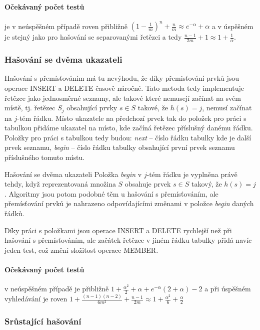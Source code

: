 \paragraph{Očekávaný počet testů} je v neúspěšném případě roven přibližně
$(1-\frac{1}{m})^n+\frac{n}{m}\approx e^{-\alpha}+\alpha$ a v úspěšném je stejný
jako pro hašování se separovanými řetězci a tedy $\frac{n-1}{2m}+1 \approx 1 +
\frac{1}{\alpha}$.

\subsubsection*{Hašování se dvěma ukazateli}

Hašování s přemísťováním má tu nevýhodu, že díky přemisťování prvků jsou operace
INSERT a DELETE časově náročné. Tato metoda tedy implementuje řetězce jako
jednosměrné seznamy, ale takové které nemusejí začínat na svém místě, tj.
řetězec $S_j$ obsahující prvky $s \in S$ takové, že $h(s)=j$, nemusí začínat na
$j$-tém řádku. Místo ukazatele na předchozí prvek tak do položek pro práci s
tabulkou přidáme ukazatel na místo, kde začíná řetězec příslušný danému řádku.
Položky pro práci s tabulkou tedy budou: \emph{next} -- číslo řádku tabulky kde
je další prvek seznamu, \emph{begin} -- číslo řádku tabulky obsahující první
prvek seznamu příslušného tomuto místu.

\begin{algoritmusN}{Hašování se dvěma ukazateli}
Položka \emph{begin} v $j$-tém řádku je vyplněna právě tehdy, když
reprezentovaná množina $S$ obsahuje prvek $s \in S$ takový, že $h(s)=j$.
Algoritmy jsou potom podobné těm u hašování s přemísťováním, ale přemísťování
prvků je nahrazeno odpovídajícími změnami v položce \emph{begin} daných řádků.
\end{algoritmusN}

Díky práci s položkami jsou operace INSERT a DELETE rychlejší než při hašování s
přemísťováním, ale začátek řetězce v jiném řádku tabulky přidá navíc jeden test,
což změní složitost operace MEMBER.

\paragraph{Očekávaný počet testů} v neúspěšném případě je přibližně
$1+\frac{\alpha^2}{2}+\alpha+e^{-\alpha}(2+\alpha)-2$ a při úspěšném vyhledávání
je roven $1+\frac{(n-1)(n-2)}{6m^2}+\frac{n-1}{2m} \approx 1 +
\frac{\alpha^2}{6}+\frac{\alpha}{2}$

\subsubsection*{Srůstající hašování}

